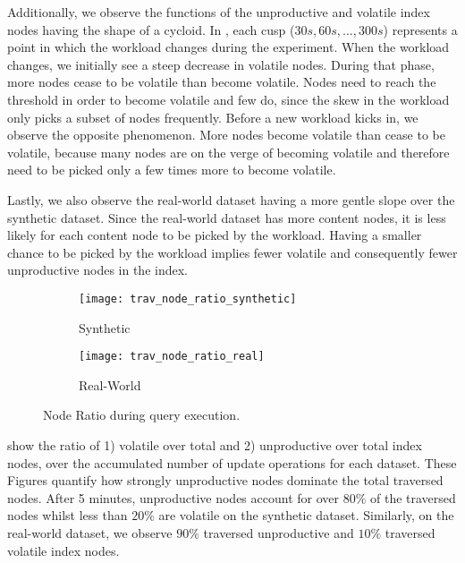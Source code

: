 \documentclass[abstracton,12pt]{scrartcl}
\theoremstyle{definition}
\begin{document}

Additionally, we observe the functions of the unproductive and volatile index
nodes having the shape of a cycloid. In , each
cusp \cite{cusp} ($30 s, 60 s, \dots, 300 s$) represents a point in which the workload
changes during the experiment. When the workload changes, we initially see a
steep decrease in volatile nodes. During that phase, more nodes cease to be
volatile than become volatile. Nodes need to reach the threshold in order to
become volatile and few do, since the skew in the workload only picks a subset of
nodes frequently. Before a new workload kicks in, we observe the opposite
phenomenon. More nodes become volatile than cease to be volatile, because many nodes are
on the verge of becoming volatile and therefore need to be picked only a few
times more to become volatile. 

Lastly, we also observe the real-world dataset having a more gentle slope over
the synthetic dataset. Since
the real-world dataset has more content nodes, it is less likely for each
content node to be picked by the workload. Having a smaller chance to be
picked by the workload implies fewer volatile and consequently fewer
unproductive nodes in the index.  

\begin{figure}[ht]
  \centering
  \begin{subfigure}{0.49\linewidth}
    \centering
    \caption{Synthetic}
    \texttt{[image: trav\_node\_ratio\_synthetic]}
    \label{fig:trav_node_ratio_synthetic}
  \end{subfigure}
  \begin{subfigure}{0.49\linewidth}
    \centering
    \caption{Real-World}
    \texttt{[image: trav\_node\_ratio\_real]}
    \label{fig:trav_node_ratio_real}
  \end{subfigure}
  \vspace{-0.5cm}
  \caption[Node Ratio during query execution]{Node Ratio during query execution.}
  \label{fig:trav_node_ratio}
\end{figure}

show the ratio of 1) volatile over total and 2) unproductive over total index nodes,
over the accumulated number of update operations for each dataset. 
These Figures quantify how
strongly unproductive nodes dominate the total traversed nodes. After 5 minutes,
unproductive nodes account for over $80\%$ of the traversed nodes whilst
less than $20\%$ are volatile on the synthetic dataset.
Similarly, on the real-world dataset, we observe $90\%$ traversed unproductive and $10\%$
traversed volatile index nodes.
\end{document}
